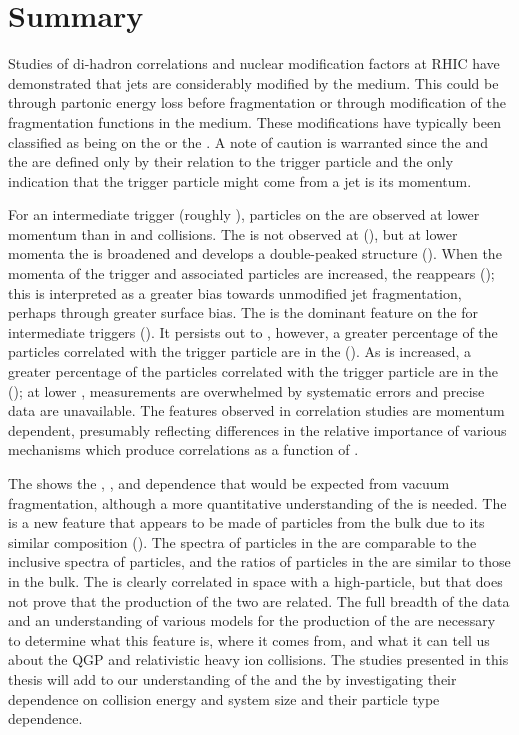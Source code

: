 \section{Summary}

Studies of di-hadron correlations and nuclear modification factors at RHIC have demonstrated that jets are considerably modified by the medium.  This could be through partonic energy loss before fragmentation or through modification of the fragmentation functions in the medium.  These modifications have typically been classified as being on the \ns or the \as.  A note of caution is warranted since the \ns and the \as are defined only by their relation to the trigger particle and the only indication that the trigger particle might come from a jet is its momentum.

For an intermediate \pT trigger (roughly ), particles on the \as are observed at lower momentum than in \pp and \dAu collisions.  The \as is not observed at \ptassoc {} \GeV (), but at lower momenta the \as is broadened and develops a double-peaked structure ().  When the momenta of the trigger and associated particles are increased, the \as reappears (); this is interpreted as a greater bias towards unmodified jet fragmentation, perhaps through greater surface bias.  The \ridge is the dominant feature on the \ns for intermediate \pT triggers ().  It persists out to \pttrig {} \GeV, however, a greater percentage of the particles correlated with the trigger particle are in the \jlc ().  As \ptassoc is increased, a greater percentage of the particles correlated with the trigger particle are in the \jlc (); at lower \ptassoc, measurements are overwhelmed by systematic errors and precise data are unavailable.  The features observed in correlation studies are momentum dependent, presumably reflecting differences in the relative importance of various mechanisms which produce correlations as a function of \pT.

The \jlc shows the \npart, \ptassoc, and \pttrig dependence that would be expected from vacuum fragmentation, although a more quantitative understanding of the \jlc is needed.  The \ridge is a new feature that appears to be made of particles from the bulk due to its similar composition ().  The spectra of particles in the \ridge are comparable to the inclusive spectra of particles, and the ratios of particles in the \ridge are similar to those in the bulk.  The \ridge is clearly correlated in space with a high-\pT particle, but that does not prove that the production of the two are related.  The full breadth of the data and an understanding of various models for the production of the \ridge are necessary to determine what this feature is, where it comes from, and what it can tell us about the QGP and relativistic heavy ion collisions.  The studies presented in this thesis will add to our understanding of the \jlc and the \ridge by investigating their dependence on collision energy and system size and their particle type dependence.